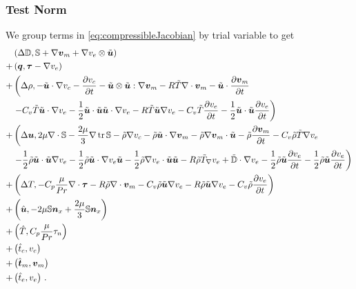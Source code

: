 \documentclass[Proposal.tex]{subfiles}
\begin{document}
\subsubsection{Test Norm}
We group terms in \eqref{eq:compressibleJacobian} by trial variable to get
\begin{equation}
\begin{aligned}
&\left( \Delta\mathbb{D},\mathbb{S}+\nabla\boldsymbol v_m+\nabla v_e\otimes\tilde{\boldsymbol u} \right)\\
+&\left( \boldsymbol q,\boldsymbol\tau-\nabla v_e \right)\\
+&\left(\Delta\rho,-\tilde{\boldsymbol u}\cdot\nabla v_c-\frac{\partial v_c}{\partial t}
-\tilde{\boldsymbol u}\otimes\tilde{\boldsymbol u}:\nabla\boldsymbol v_m
-R\tilde T\nabla\cdot\boldsymbol v_m-\tilde{\boldsymbol u}\cdot\frac{\partial\boldsymbol v_m}{\partial t}\right.\\
&\left.-C_v\tilde T\tilde{\boldsymbol u}\cdot\nabla v_e-\frac{1}{2}\tilde{\boldsymbol u}\cdot\tilde{\boldsymbol u}\tilde{\boldsymbol u}\cdot\nabla v_e
-R\tilde T\tilde{\boldsymbol u}\nabla v_e
-C_v\tilde T\frac{\partial v_e}{\partial t}-\frac{1}{2}\tilde{\boldsymbol u}\cdot\tilde{\boldsymbol u}\frac{\partial v_e}{\partial t}
\right)\\
+&\left(\Delta\boldsymbol u,2\mu\nabla\cdot\mathbb{S}-\frac{2\mu}{3}\nabla\operatorname*{tr}{\mathbb{S}}
-\tilde\rho\nabla v_c
-\tilde\rho\tilde{\boldsymbol u}\cdot\nabla\boldsymbol v_m-\tilde\rho\nabla\boldsymbol v_m\cdot\tilde{\boldsymbol u}
-\tilde\rho\frac{\partial\boldsymbol v_m}{\partial t}
-C_v\tilde\rho\tilde T\nabla v_e\right.\\
&\left.
-\frac{1}{2}\tilde\rho\tilde{\boldsymbol u}\cdot\tilde{\boldsymbol u}\nabla v_e
-\frac{1}{2}\tilde\rho\tilde{\boldsymbol u}\cdot\nabla v_e\tilde{\boldsymbol u}
-\frac{1}{2}\tilde\rho\nabla v_e\cdot\tilde{\boldsymbol u}\tilde{\boldsymbol u}
-R\tilde\rho\tilde T_{\nabla} v_e
+\tilde{\mathbb{D}}\cdot\nabla v_e
-\frac{1}{2}\tilde\rho\tilde{\boldsymbol u}\frac{\partial v_e}{\partial t}
-\frac{1}{2}\tilde\rho\tilde{\boldsymbol u}\frac{\partial v_e}{\partial t}
\right)\\
+&\left(\Delta T,-C_p\frac{\mu}{Pr}\nabla\cdot\boldsymbol\tau
-R\tilde\rho\nabla\cdot\boldsymbol v_m
-C_v\tilde\rho\tilde{\boldsymbol u}\nabla v_e
-R\tilde\rho\tilde{\boldsymbol u}\nabla v_e
-C_v\tilde\rho\frac{\partial v_e}{\partial t}
\right)\\
+&\left( \hat{\boldsymbol u},-2\mu\mathbb{S}\boldsymbol n_x+\frac{2\mu}{3}\mathbb{S}\boldsymbol n_x \right)\\
+&\left( \hat T,C_p\frac{\mu}{Pr}\tau_n \right)\\
+&\left( \hat t_c,v_c \right)\\
+&\left( \hat{\boldsymbol t}_m,\boldsymbol v_m \right)\\
+&\left( \hat t_e,v_e \right)\,.
\end{aligned}	
\end{equation}
\end{document}
